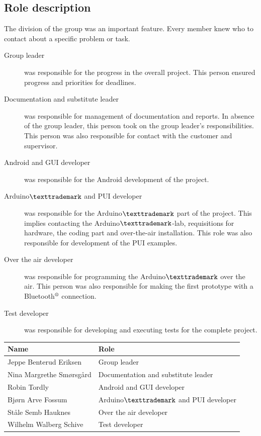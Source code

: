 \subsection{Role description}
The division of the group was an important feature. Every member knew who to contact about a specific problem or task.\\

\begin{description}
	\item[Group leader]{was responsible for the progress in the overall project. This person ensured progress and priorities for deadlines.}
	\item[Documentation and substitute leader]{was responsible for management of documentation and reports. In absence of the group leader, this person took on the group leader's responsibilities. This person was also responsible for contact with the customer and supervisor.}
	\item[Android and GUI developer]{was responsible for the Android development of the project.}
	\item[Arduino$\texttrademark$ and PUI developer]{was responsible for the Arduino$\texttrademark$ part of the project. This implies contacting the Arduino$\texttrademark$-lab, requisitions for hardware, the coding part and over-the-air installation. This role was also responsible for development of the PUI examples.}
	\item[Over the air developer]{was responsible for programming the Arduino$\texttrademark$ over the air. This person was also responsible for making the first prototype with a Bluetooth$\textsuperscript{\textregistered}$  connection.}
	\item[Test developer]{was responsible for developing and executing tests for the complete project.}
\end{description}

\begin{table}[H]
\centering
\label{table:teamroles}
\begin{tabular}{|l|l|}
\hline
	{\bf Name} & {\bf Role}\\
\hline
	Jeppe Benterud Eriksen & Group leader\\
\hline
	Nina Margrethe Smørsgård & Documentation and substitute leader\\
\hline
	Robin Tordly & Android and GUI developer\\
\hline
	Bjørn Arve Fossum & Arduino$\texttrademark$ and PUI developer\\
\hline
	Ståle Semb Hauknes & Over the air developer\\
\hline
	Wilhelm Walberg Schive & Test developer\\
\hline
\end{tabular}
\end{table}

